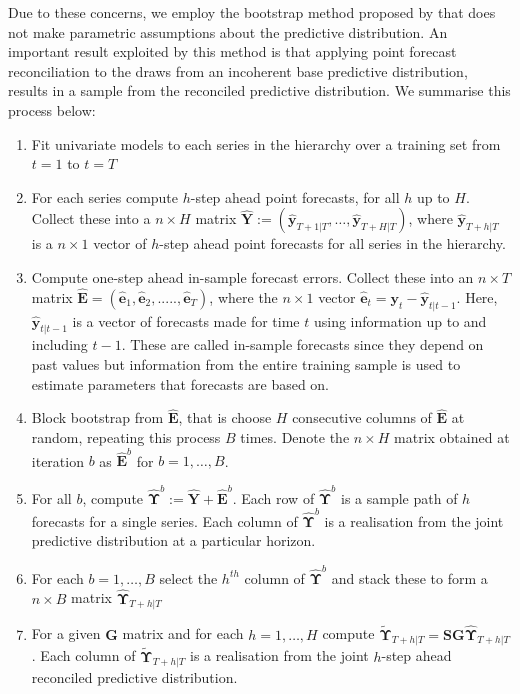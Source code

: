 \documentclass[graybox]{svmult}
\begin{document}
Due to these concerns, we employ the bootstrap method proposed by \cite{GamEtAl2018} that does not make parametric assumptions about the predictive distribution. An important result exploited by this method is that applying point forecast reconciliation to the draws from an incoherent base predictive distribution, results in a sample from the reconciled predictive distribution. We summarise this process below:


\begin{enumerate}
	\item Fit univariate models to each series in the hierarchy over a training set from $t=1$ to $t=T$
	\item For each series compute $h$-step ahead point forecasts, for all $h$ up to $H$. Collect these into a $n\times H$ matrix $\hat{\bm Y}:=(\hat{\bm{y}}_{T+1|T},\ldots,\hat{\bm{y}}_{T+H|T})$, where $\hat{\bm{y}}_{T+h|T}$ is a $n\times 1$ vector of $h$-step ahead point forecasts for all series in the hierarchy.
	\item Compute one-step ahead in-sample forecast errors. Collect these into an $n \times T$ matrix ${\hat{\bm E}}=(\hat{\bm{e}}_1,\hat{\bm{e}}_2,.....,\hat{\bm{e}}_T)$, where the $n\times 1$ vector $\hat{\bm{e}}_t={\bm y}_t-\hat{\bm {y}}_{t|t-1}$.  Here, $\hat{\bm {y}}_{t|t-1}$ is a vector of forecasts made for time $t$ using information up to and including $t-1$. These are called in-sample forecasts since they depend on past values but information from the entire training sample is used to estimate parameters that forecasts are based on.
	\item Block bootstrap from $\hat{\bm{E}}$, that is choose $H$ consecutive columns of $\hat{{\bm E}}$ at random, repeating this process $B$ times.  Denote the $n\times H$ matrix obtained at iteration $b$ as $\hat{{\bm E}}^b$ for $b=1,\ldots,B$.
	\item For all $b$, compute $\hat{\bm \Upsilon}^b:=\hat{\bm Y}+{\bm \hat{\bm{E}}}^b$. Each row of $\hat{\bm \Upsilon}^b$ is a sample path of $h$ forecasts for a single series.  Each column of $\hat{\bm \Upsilon}^b$ is a realisation from the joint predictive distribution at a particular horizon.
	\item For each $b=1,\ldots,B$ select the $h^{th}$ column of $\hat{\bm \Upsilon}^b$ and stack these to form a $n\times B$ matrix $\hat{\bm{\Upsilon}}_{T+h|T}$
	\item For a given ${\bm G}$ matrix and for each $h=1,\ldots,H$ compute $\tilde{\bm{\Upsilon}}_{T+h|T}={\bm S}{\bm G}\hat{\bm{\Upsilon}}_{T+h|T}$.   Each column of $\tilde{\bm \Upsilon}_{T+h|T}$ is a realisation from the joint $h$-step ahead reconciled predictive distribution.
\end{enumerate}
\end{document}
